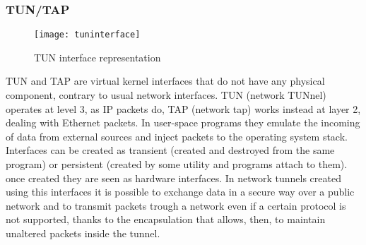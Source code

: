 \subsubsection*{TUN/TAP}
\begin{figure}
  \centering \texttt{[image: tuninterface]}
  \caption{TUN interface representation}
  \label{chap:prjan:img:tun}
\end{figure}
TUN and TAP are virtual kernel interfaces that do not have any physical
component, contrary to usual network interfaces. TUN (network TUNnel) operates
at level 3, as IP packets do, TAP (network tap) works instead at layer 2,
dealing with Ethernet packets. In user-space programs they emulate the incoming
of data from external sources and inject packets to the operating system
stack. Interfaces can be created as transient (created and destroyed from the
same program) or persistent (created by some utility and programs attach to
them). once created they are seen as hardware interfaces. In network tunnels
created using this interfaces it is possible to exchange data in a secure way
over a public network and to transmit packets trough a network even if a certain
protocol is not supported, thanks to the encapsulation that allows, then,
to maintain unaltered packets inside the tunnel.

